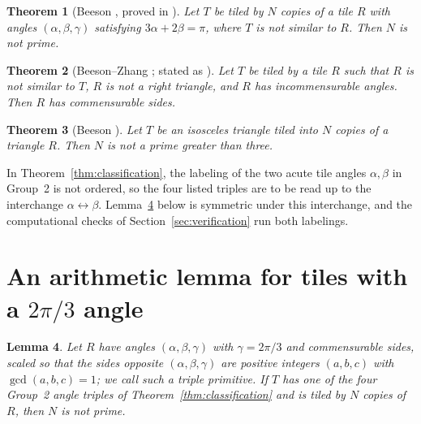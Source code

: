 \documentclass[11pt]{amsart}
\newtheorem{theorem}{Theorem}
\newtheorem{lemma}[theorem]{Lemma}
\theoremstyle{remark}
\begin{document}
\begin{theorem}[{Beeson \cite[Theorem~1]{BeesonPrime}, proved in \cite{Beeson2229}}]\label{thm:group1prime}
Let $T$ be tiled by $N$ copies of a tile $R$ with angles $(\alpha,\beta,\gamma)$ satisfying $3\alpha+2\beta=\pi$, where $T$ is not similar to $R$. Then $N$ is not prime.
\end{theorem}

\begin{theorem}[{Beeson--Zhang \cite[Theorem~1.2]{BZRat}; stated as \cite[Theorem~6]{BLZ633}}]\label{thm:rationality}
Let $T$ be tiled by a tile $R$ such that $R$ is not similar to $T$, $R$ is not a right triangle, and $R$ has incommensurable angles. Then $R$ has commensurable sides.
\end{theorem}

\begin{theorem}[{Beeson \cite[Theorem~11]{BeesonPrime}}]\label{thm:isosceles}
Let $T$ be an isosceles triangle tiled into $N$ copies of a triangle $R$. Then $N$ is not a prime greater than three.
\end{theorem}

In Theorem~\ref{thm:classification}, the labeling of the two acute tile angles $\alpha,\beta$ in Group~2 is not ordered, so the four listed triples are to be read up to the interchange $\alpha\leftrightarrow\beta$. Lemma~\ref{lem:group2} below is symmetric under this interchange, and the computational checks of Section~\ref{sec:verification} run both labelings.

\section{An arithmetic lemma for tiles with a \texorpdfstring{$2\pi/3$}{2pi/3} angle}\label{sec:lemma}

\begin{lemma}\label{lem:group2}
Let $R$ have angles $(\alpha,\beta,\gamma)$ with $\gamma=2\pi/3$ and commensurable sides, scaled so that the sides opposite $(\alpha,\beta,\gamma)$ are positive integers $(a,b,c)$ with $\gcd(a,b,c)=1$; we call such a triple \emph{primitive}. If $T$ has one of the four Group~2 angle triples of Theorem~\ref{thm:classification} and is tiled by $N$ copies of $R$, then $N$ is not prime.
\end{lemma}
\end{document}
